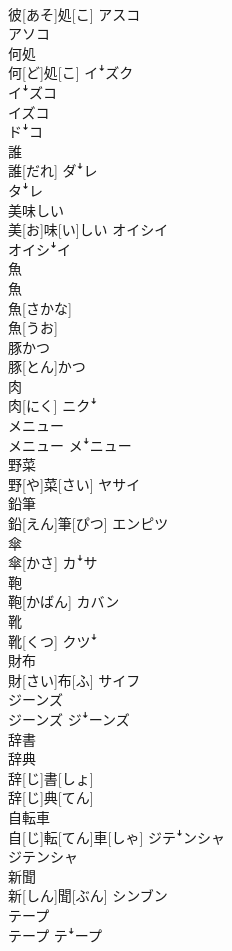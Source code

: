 \documentclass[8pt]{extreport}
\begin{document}
\begin{CJK}{UTF8}{min}
\\	彼[あそ]処[こ]	アスコ 
\\	アソコ
\\	何処	
\\	何[ど]処[こ]	イꜜズク 
\\	イꜜズコ 
\\	イズコ 
\\	ドꜜコ
\\	誰	
\\	誰[だれ]	ダꜜレ 
\\	タꜜレ
\\	美味しい	
\\	美[お]味[い]しい	オイシイ 
\\	オイシꜜイ
\\	魚 
\\	魚	
\\	魚[さかな] 
\\	魚[うお]	
\\	豚かつ	
\\	豚[とん]かつ	
\\	肉	
\\	肉[にく]	ニクꜜ
\\	メニュー	
\\	メニュー	メꜜニュー
\\	野菜	
\\	野[や]菜[さい]	ヤサイ
\\	鉛筆	
\\	鉛[えん]筆[ぴつ]	エンピツ
\\	傘	
\\	傘[かさ]	カꜜサ
\\	鞄	
\\	鞄[かばん]	カバン
\\	靴	
\\	靴[くつ]	クツꜜ
\\	財布	
\\	財[さい]布[ふ]	サイフ
\\	ジーンズ	
\\	ジーンズ	ジꜜーンズ
\\	辞書 
\\	辞典	
\\	辞[じ]書[しょ] 
\\	辞[じ]典[てん]	
\\	自転車	
\\	自[じ]転[てん]車[しゃ]	ジテꜜンシャ 
\\	ジテンシャ
\\	新聞	
\\	新[しん]聞[ぶん]	シンブン
\\	テープ	
\\	テープ	テꜜープ

\end{CJK}
\end{document}
